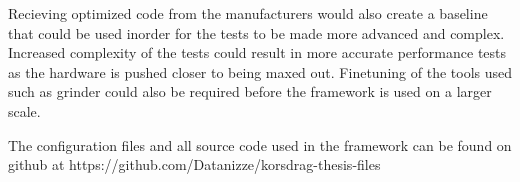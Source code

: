 Recieving optimized code from the manufacturers would also create a baseline that could be used inorder for the tests to be made more advanced and complex.
Increased complexity of the tests could result in more accurate performance tests as the hardware is pushed closer to being maxed out.
Finetuning of the tools used such as grinder could also be required before the framework is used on a larger scale.

The configuration files and all source code used in the framework can be found on github at https://github.com/Datanizze/korsdrag-thesis-files
